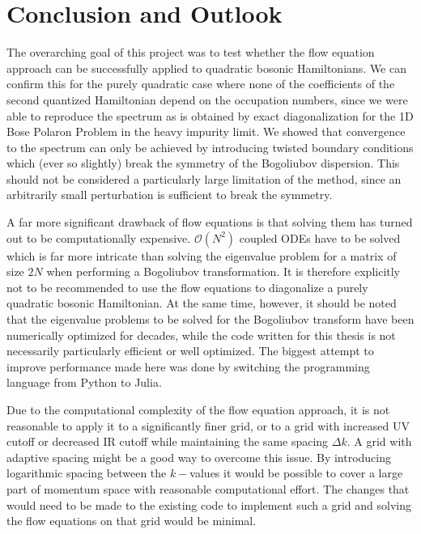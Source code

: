 \chapter{Conclusion and Outlook}\label{Conclusion and Outlook}
The overarching goal of this project was to test whether the flow equation approach can be successfully applied to quadratic bosonic Hamiltonians. We can confirm this for the purely quadratic case where none of the coefficients of the second quantized Hamiltonian depend on the occupation numbers, since we were able to reproduce the spectrum as is obtained by exact diagonalization for the 1D Bose Polaron Problem in the heavy impurity limit. We showed that convergence to the spectrum can only be achieved by introducing twisted boundary conditions which (ever so slightly) break the symmetry of the Bogoliubov dispersion. This should not be considered a particularly large limitation of the method, since an arbitrarily small perturbation is sufficient to break the symmetry. \par
A far more significant drawback of flow equations is that solving them has turned out to be computationally expensive. $\mathcal O(N^2)$ coupled ODEs have to be solved which is far more intricate than solving the eigenvalue problem for a matrix of size $2N$ when performing a Bogoliubov transformation. It is therefore explicitly not to be recommended to use the flow equations to diagonalize a purely quadratic bosonic Hamiltonian. At the same time, however, it should be noted that the eigenvalue problems to be solved for the Bogoliubov transform have been numerically optimized for decades, while the code written for this thesis is not necessarily particularly efficient or well optimized. The biggest attempt to improve performance made here was done by switching the programming language from Python to Julia.\par
Due to the computational complexity of the flow equation approach, it is not reasonable to apply it to a significantly finer grid, or to a grid with increased UV cutoff or decreased IR cutoff while maintaining the same spacing $\Delta k$. A grid with adaptive spacing might be a good way to overcome this issue. By introducing logarithmic spacing between the $k-$values it would be possible to cover a large part of momentum space with reasonable computational effort. The changes that would need to be made to the existing code to implement such a grid and solving the flow equations on that grid would be minimal.   \par
